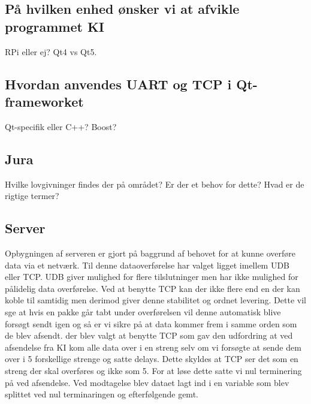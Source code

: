 \subsection{På hvilken enhed ønsker vi at afvikle programmet KI}
RPi eller ej? Qt4 vs Qt5.
\subsection{Hvordan anvendes UART og TCP i Qt-frameworket}
Qt-specifik eller C++? Boost? 

\subsection{Jura}
Hvilke lovgivninger findes der på området? Er der et behov for dette? Hvad er de rigtige termer? 

\subsection{Server}
Opbygningen af serveren er gjort på baggrund af behovet for at kunne overføre data via et netværk. Til denne dataoverførelse har valget ligget imellem UDB eller TCP. UDB giver mulighed for flere tilslutninger men har ikke mulighed for pålidelig data overførelse. Ved at benytte TCP kan der ikke flere end en der kan koble til samtidig men derimod giver denne stabilitet og ordnet levering. Dette vil sge at hvis en pakke går tabt under overførelsen vil denne automatisk blive forsøgt sendt igen og så er vi sikre på at data kommer frem i samme orden som de blev afsendt. 
der blev valgt at benytte TCP som gav den udfordring at ved afsendelse fra KI kom alle data over i en streng selv om vi forsøgte at sende dem over i 5 forskellige strenge og satte delays. Dette skyldes at TCP ser det som en streng der skal overføres og ikke som 5. For at løse dette satte vi nul terminering på ved afsendelse. Ved modtagelse blev dataet lagt ind i en variable som blev splittet ved nul terminaringen og efterfølgende gemt.

